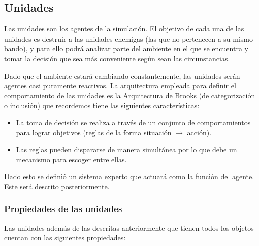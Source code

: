 \subsection{Unidades}

Las unidades son los agentes de la simulaci\'on. El objetivo de cada una de las unidades es destruir a las unidades enemigas (las que no pertenecen a su mismo bando), y para ello podr\'a analizar parte del ambiente en el que se encuentra y tomar la decisi\'on que sea m\'as conveniente seg\'un sean las circunstancias. 

Dado que el ambiente estar\'a cambiando constantemente, las unidades ser\'an agentes casi puramente reactivos. La arquitectura empleada para definir el comportamiento de las unidades es la Arquitectura de Brooks (de categorización o inclusión) que recordemos tiene las siguientes caracter\'isticas: 

\begin{itemize}
	\item La toma de decisión se realiza a través de un conjunto de comportamientos para lograr objetivos (reglas de la forma situación $\rightarrow$ acción).
	\item Las reglas pueden dispararse de manera simultánea por lo que debe un mecanismo para escoger entre ellas.	
\end{itemize}

Dado esto se defini\'o un sistema experto que actuar\'a como la funci\'on del agente. Este ser\'a descrito posteriormente.

\subsubsection{Propiedades de las unidades}

Las unidades adem\'as de las descritas anteriormente que tienen todos los objetos cuentan con las siguientes propiedades:

